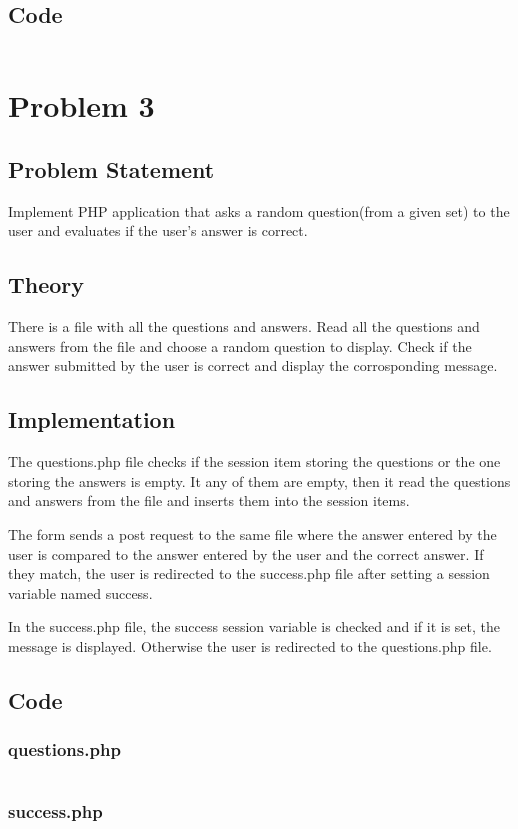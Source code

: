 \documentclass[10pt,a4paper,titlepage]{report}
\begin{document}
\section*{Code}

\inputminted[tabsize=4]{bash}{../Scripts/Exam/marks}

\chapter*{Problem 3}

\section*{Problem Statement}

Implement PHP application that asks a random question(from a given set) to
the user and evaluates if the user’s answer is correct.

\section*{Theory}

There is a file with all the questions and answers. Read all the questions and answers from the file and choose a random question to display. Check if the answer submitted by the user is correct and display the corrosponding message.

\section*{Implementation}

The questions.php file checks if the session item storing the questions or the one storing the answers is empty. It any of them are empty, then it read the questions and answers from the file and inserts them into the session items. 

The form sends a post request to the same file where the answer entered by the user is compared to the answer entered by the user and the correct answer. If they match, the user is redirected to the success.php file after setting a session variable named success. 

In the success.php file, the success session variable is checked and if it is set, the message is displayed. Otherwise the user is redirected to the questions.php file.

\section*{Code}

\subsection*{questions.php}

\inputminted[tabsize=4]{php}{../Scripts/Exam/questions.php}

\subsection*{success.php}

\inputminted[tabsize=4]{php}{../Scripts/Exam/success.php}
\end{document}
